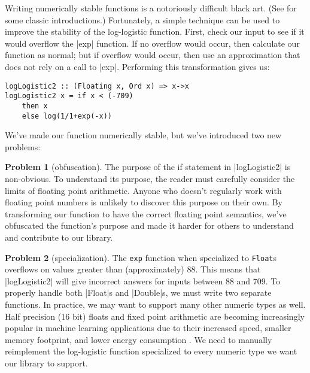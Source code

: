 \documentclass[preprint]{sigplanconf}
\theoremstyle{definition}
\newtheorem{problem}{Problem}
\begin{document}
Writing numerically stable functions is a notoriously difficult black art.
(See \cite{goldberg1991,higham2002,hamming2012} for some classic introductions.)
Fortunately, a simple technique can be used to improve the stability of the log-logistic function.
First, check our input to see if it would overflow the |exp| function.
If no overflow would occur, then calculate our function as normal;
but if overflow would occur, then use an approximation that does not rely on a call to |exp|.
Performing this transformation gives us:
\begin{lstlisting}
logLogistic2 :: (Floating x, Ord x) => x->x
logLogistic2 x = if x < (-709)
    then x
    else log(1/1+exp(-x))
\end{lstlisting}
We've made our function numerically stable, but we've introduced two new problems:

\begin{problem}[obfuscation]
The purpose of the if statement in |logLogistic2| is non-obvious.
To understand its purpose,
the reader must carefully consider the limits of floating point arithmetic.
Anyone who doesn't regularly work with floating point numbers is unlikely to discover this purpose on their own.
By transforming our function to have the correct floating point semantics,
we've obfuscated the function's purpose and made it harder for others to understand and contribute to our library.
\end{problem}

\begin{problem}[specialization]
The \lstinline{exp} function when specialized to \lstinline{Float}s overflows on values greater than (approximately) 88.
This means that |logLogistic2| will give incorrect answers for inputs between 88 and 709.
To properly handle both |Float|s and |Double|s,
we must write two separate functions.
In practice, we may want to support many other numeric types as well.
Half precision (16 bit) floats and fixed point arithmetic are becoming increasingly popular in machine learning applications due to their increased speed, smaller memory footprint, and lower energy consumption \cite{gupta2015}.
We need to manually reimplement the log-logistic function specialized to every numeric type we want our library to support.
\end{problem}
\end{document}
